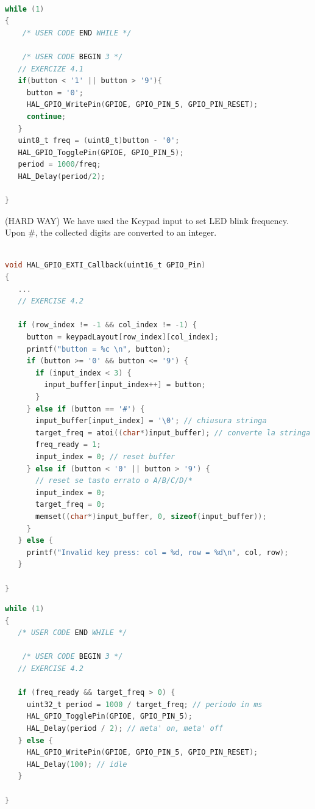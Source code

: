 \noindent
\begin{lstlisting}[language=C]

while (1)
{
    /* USER CODE END WHILE */

    /* USER CODE BEGIN 3 */
   // EXERCIZE 4.1
   if(button < '1' || button > '9'){
     button = '0';
     HAL_GPIO_WritePin(GPIOE, GPIO_PIN_5, GPIO_PIN_RESET);
     continue;
   }
   uint8_t freq = (uint8_t)button - '0';
   HAL_GPIO_TogglePin(GPIOE, GPIO_PIN_5);
   period = 1000/freq;
   HAL_Delay(period/2);

}


\end{lstlisting}


\bigskip
\noindent
(HARD WAY)
We have used the Keypad input to set LED blink frequency. Upon $\#$, the collected digits are converted to an integer. 


\bigskip
\noindent
\begin{lstlisting}[language=C]

void HAL_GPIO_EXTI_Callback(uint16_t GPIO_Pin)
{
   ...
   // EXERCISE 4.2

   if (row_index != -1 && col_index != -1) {
     button = keypadLayout[row_index][col_index];
     printf("button = %c \n", button);
     if (button >= '0' && button <= '9') {
       if (input_index < 3) {
         input_buffer[input_index++] = button;
       }
     } else if (button == '#') {
       input_buffer[input_index] = '\0'; // chiusura stringa
       target_freq = atoi((char*)input_buffer); // converte la stringa in intero
       freq_ready = 1;
       input_index = 0; // reset buffer
     } else if (button < '0' || button > '9') {
       // reset se tasto errato o A/B/C/D/*
       input_index = 0;
       target_freq = 0;
       memset((char*)input_buffer, 0, sizeof(input_buffer));
     }
   } else {
     printf("Invalid key press: col = %d, row = %d\n", col, row);
   }

}

\end{lstlisting}

\begin{lstlisting}[language=C]
while (1)
{
   /* USER CODE END WHILE */

    /* USER CODE BEGIN 3 */
   // EXERCISE 4.2

   if (freq_ready && target_freq > 0) {
     uint32_t period = 1000 / target_freq; // periodo in ms
     HAL_GPIO_TogglePin(GPIOE, GPIO_PIN_5);
     HAL_Delay(period / 2); // meta' on, meta' off
   } else {
     HAL_GPIO_WritePin(GPIOE, GPIO_PIN_5, GPIO_PIN_RESET);
     HAL_Delay(100); // idle
   }

}


\end{lstlisting}

